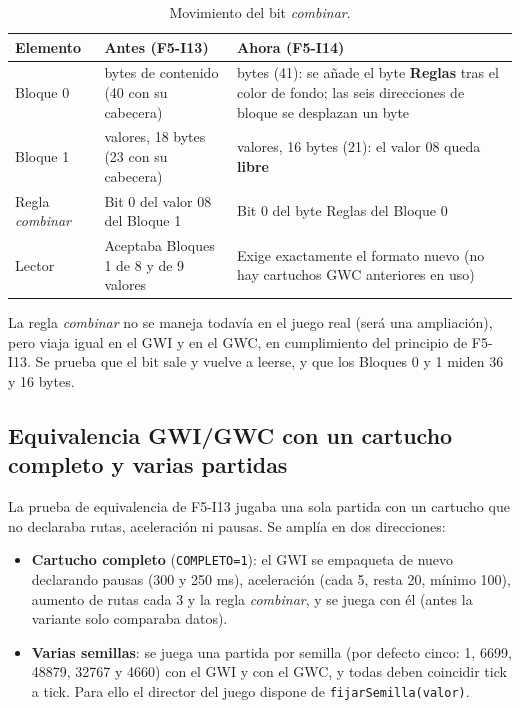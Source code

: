 \begin{table}[htbp]
	\centering
	\begin{tabularx}{\textwidth}{l >{\RaggedRight\arraybackslash}X >{\RaggedRight\arraybackslash}X}
		\toprule
		\textbf{Elemento} & \textbf{Antes (F5-I13)} & \textbf{Ahora (F5-I14)} \\
		\midrule
		Bloque 0 & 35 bytes de contenido (40 con su cabecera) & 36 bytes (41): se añade el byte \textbf{Reglas} tras el color de fondo; las seis direcciones de bloque se desplazan un byte \\
		Bloque 1 & 9 valores, 18 bytes (23 con su cabecera) & 8 valores, 16 bytes (21): el valor 08 queda \textbf{libre} \\
		Regla \emph{combinar} & Bit 0 del valor 08 del Bloque 1 & Bit 0 del byte Reglas del Bloque 0 \\
		Lector & Aceptaba Bloques 1 de 8 y de 9 valores & Exige exactamente el formato nuevo (no hay cartuchos GWC anteriores en uso) \\
		\bottomrule
	\end{tabularx}
	\caption{Movimiento del bit \emph{combinar}.}
\end{table}

La regla \emph{combinar} no se maneja todavía en el juego real (será una ampliación), pero viaja igual en el GWI y en el GWC, en cumplimiento del principio de F5-I13. Se prueba que el bit sale y vuelve a leerse, y que los Bloques 0 y 1 miden 36 y 16 bytes.

\subsection{Equivalencia GWI/GWC con un cartucho completo y varias partidas}
\label{sec:F5I14Equivalencia}

La prueba de equivalencia de F5-I13 jugaba una sola partida con un cartucho que no declaraba rutas, aceleración ni pausas. Se amplía en dos direcciones:

\begin{itemize}
	\item \textbf{Cartucho completo} (\texttt{COMPLETO=1}): el GWI se empaqueta de nuevo declarando pausas (300 y 250 ms), aceleración (cada 5, resta 20, mínimo 100), aumento de rutas cada 3 y la regla \emph{combinar}, y se juega con él (antes la variante solo comparaba datos).
	\item \textbf{Varias semillas}: se juega una partida por semilla (por defecto cinco: 1, 6699, 48879, 32767 y 4660) con el GWI y con el GWC, y todas deben coincidir tick a tick. Para ello el director del juego dispone de \texttt{fijarSemilla(valor)}.
\end{itemize}

